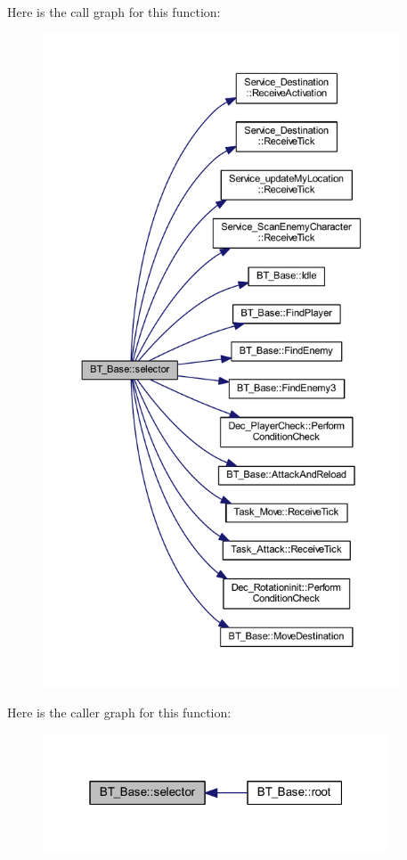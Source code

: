 Here is the call graph for this function\+:
\nopagebreak
\begin{figure}[H]
\begin{center}
\leavevmode
\includegraphics[height=550pt]{class_b_t___base_adbbf3731340b4e525a1ea549fd6409f3_cgraph}
\end{center}
\end{figure}




Here is the caller graph for this function\+:\nopagebreak
\begin{figure}[H]
\begin{center}
\leavevmode
\includegraphics[width=292pt]{class_b_t___base_adbbf3731340b4e525a1ea549fd6409f3_icgraph}
\end{center}
\end{figure}




